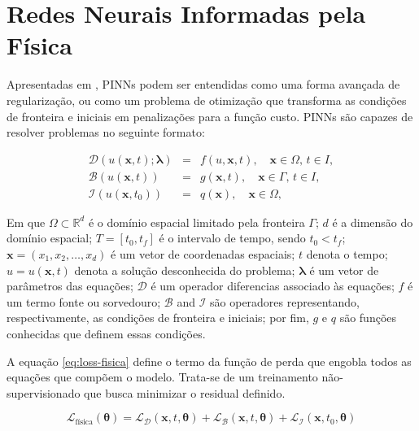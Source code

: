 \section{Redes Neurais Informadas pela Física}

Apresentadas em \cite{raissi-etal:19}, PINNs podem ser entendidas como uma forma
avançada de regularização, ou como um problema de otimização que transforma 
as condições de fronteira e iniciais em penalizações para a função custo. PINNs
são capazes de resolver problemas no seguinte formato: 

\begin{eqnarray}
    \mathcal{D}(u(\boldsymbol{x},t);\boldsymbol{\lambda}) &=& f(u,\boldsymbol{x},t), \quad \boldsymbol{x} \in \Omega, \, t \in I, \label{model-1-a}\\
    \mathcal{B}(u(\boldsymbol{x},t)) &=& g(\boldsymbol{x},t), \quad \boldsymbol{x} \in \Gamma, \, t \in I, \label{model-1-b}\\
    \mathcal{I}(u(\boldsymbol{x},t_0)) &=& q(\boldsymbol{x}), \quad \boldsymbol{x} \in \Omega, \label{model-1-c}
\end{eqnarray}

Em que $\Omega \subset \mathbb{R}^d$ é o domínio espacial limitado pela 
fronteira $\Gamma$; 
$d$ é a dimensão do domínio espacial; 
$T = [t_0, t_f]$ é o intervalo de tempo, sendo $t_0 < t_f$; 
$\boldsymbol{x} = (x_1, x_2, \dots, x_d)$ é um vetor de coordenadas espaciais; 
$t$ denota o tempo; 
$u = u(\boldsymbol{x}, t)$ denota a solução desconhecida do problema; 
$\boldsymbol{\lambda}$ é um vetor de parâmetros das equações; 
$\mathcal{D}$ é um operador diferencias associado às equações; 
$f$ é um termo fonte ou sorvedouro; 
$\mathcal{B}$ and $\mathcal{I}$ são operadores representando, respectivamente,
as condições de fronteira e iniciais; 
por fim, $g$ e $q$ são funções conhecidas que definem essas condições.

A equação \ref{eq:loss-fisica} define o termo da função de perda que engobla
todos as equações que compõem o modelo. Trata-se de um treinamento 
não-supervisionado que busca minimizar o residual definido.

\begin{equation}\label{eq:loss-fisica}
    \mathcal{L}_{\text{física}}(\boldsymbol{\theta}) 
    = \mathcal{L}_{\mathcal{D}}(\boldsymbol{x},t,\boldsymbol{\theta}) 
    + \mathcal{L}_{\mathcal{B}}(\boldsymbol{x},t,\boldsymbol{\theta}) 
    + \mathcal{L}_{\mathcal{I}}(\boldsymbol{x},t_0,\boldsymbol{\theta}) 
\end{equation}

